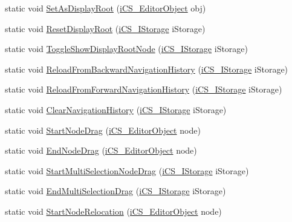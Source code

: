 \begin{DoxyCompactItemize}
\item 
static void \hyperlink{classi_c_s___user_commands_a6aa6bf845c11e503c5ccba8967f18bb8}{Set\+As\+Display\+Root} (\hyperlink{classi_c_s___editor_object}{i\+C\+S\+\_\+\+Editor\+Object} obj)
\item 
static void \hyperlink{classi_c_s___user_commands_a7e21a7522804a83fbc6b6417eaad0f3a}{Reset\+Display\+Root} (\hyperlink{classi_c_s___i_storage}{i\+C\+S\+\_\+\+I\+Storage} i\+Storage)
\item 
static void \hyperlink{classi_c_s___user_commands_a6761a57c72ed3d49a083709cc5caa96b}{Toggle\+Show\+Display\+Root\+Node} (\hyperlink{classi_c_s___i_storage}{i\+C\+S\+\_\+\+I\+Storage} i\+Storage)
\item 
static void \hyperlink{classi_c_s___user_commands_a5f7d6311ab4631f370e47067b943c90a}{Reload\+From\+Backward\+Navigation\+History} (\hyperlink{classi_c_s___i_storage}{i\+C\+S\+\_\+\+I\+Storage} i\+Storage)
\item 
static void \hyperlink{classi_c_s___user_commands_a179c9f9fc1fe4c934eb9dbd5d01458e4}{Reload\+From\+Forward\+Navigation\+History} (\hyperlink{classi_c_s___i_storage}{i\+C\+S\+\_\+\+I\+Storage} i\+Storage)
\item 
static void \hyperlink{classi_c_s___user_commands_a48a55f407c1a7e8a6d8f177af58c2fff}{Clear\+Navigation\+History} (\hyperlink{classi_c_s___i_storage}{i\+C\+S\+\_\+\+I\+Storage} i\+Storage)
\item 
static void \hyperlink{classi_c_s___user_commands_a979be0baf337d8a99cdbcb31d695e84f}{Start\+Node\+Drag} (\hyperlink{classi_c_s___editor_object}{i\+C\+S\+\_\+\+Editor\+Object} node)
\item 
static void \hyperlink{classi_c_s___user_commands_a8b13d03629785518e5d5cdb3e74a8871}{End\+Node\+Drag} (\hyperlink{classi_c_s___editor_object}{i\+C\+S\+\_\+\+Editor\+Object} node)
\item 
static void \hyperlink{classi_c_s___user_commands_a563230c1916edec73c5b37eb7674c2d6}{Start\+Multi\+Selection\+Node\+Drag} (\hyperlink{classi_c_s___i_storage}{i\+C\+S\+\_\+\+I\+Storage} i\+Storage)
\item 
static void \hyperlink{classi_c_s___user_commands_a7baa9760a8ee5ccb3c05a63e2d0b5166}{End\+Multi\+Selection\+Drag} (\hyperlink{classi_c_s___i_storage}{i\+C\+S\+\_\+\+I\+Storage} i\+Storage)
\item 
static void \hyperlink{classi_c_s___user_commands_a635498be10c0cb5ecddfb434b27d57a1}{Start\+Node\+Relocation} (\hyperlink{classi_c_s___editor_object}{i\+C\+S\+\_\+\+Editor\+Object} node)

\end{DoxyCompactItemize}
